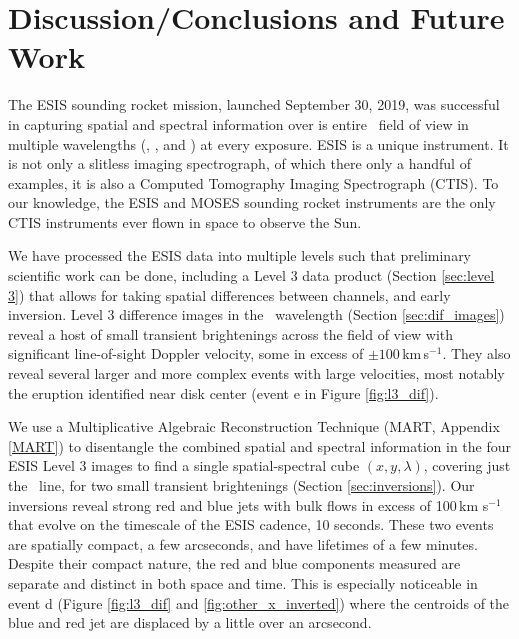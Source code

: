     	
\section{Discussion/Conclusions and Future Work}
	The ESIS sounding rocket mission, launched September 30, 2019, was successful in capturing spatial and spectral information over is entire \esisfov \ field of view in multiple wavelengths (\hei, \mgxbright, and \ov) at every exposure.
	ESIS is a unique instrument.  
	It is not only a slitless imaging spectrograph, of which there only a handful of examples, it is also a Computed Tomography Imaging Spectrograph (CTIS).  
	To our knowledge, the ESIS and MOSES sounding rocket instruments are the only CTIS instruments ever flown in space to observe the Sun. 
	
	We have processed the  ESIS data into multiple levels such that preliminary scientific work can be done, including a Level 3 data product (Section \ref{sec:level 3}) that allows for taking spatial differences between channels, and early inversion.
	Level 3 difference images in the \ov \ wavelength (Section \ref{sec:dif_images}) reveal a host of small transient brightenings across the field of view with significant line-of-sight Doppler velocity, some in excess of $\pm 100\,$km\,s$^{-1}$.
	They also reveal several larger and more complex events with large velocities, most notably the eruption identified near disk center (event e in Figure \ref{fig:l3_dif}).
	
	We use a Multiplicative Algebraic Reconstruction Technique (MART, Appendix \ref{MART}) to disentangle the combined spatial and spectral information in the four ESIS Level 3 images to find a single spatial-spectral cube $(x,y,\lambda)$, covering just the \ov\ line, for two small transient brightenings (Section \ref{sec:inversions}).
	Our inversions reveal strong red and blue jets with bulk flows in excess of 100\,km s$^{-1}$ that evolve on the timescale of the ESIS cadence, 10 seconds.
	These two events are spatially compact, a few arcseconds, and have lifetimes of a few minutes.
	Despite their compact nature, the red and blue components measured are separate and distinct in both space and time. 
	This is especially noticeable in event d (Figure \ref{fig:l3_dif} and \ref{fig:other_x_inverted}) where the centroids of the blue and red jet are displaced by a little over an arcsecond. 
	
